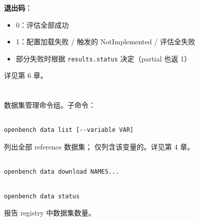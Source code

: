 \textbf{退出码}：

\begin{itemize}
  \item 0：评估全部成功
  \item 1：配置加载失败 /  触发的 NotImplemented / 评估全失败
  \item 部分失败时根据 \texttt{results.status} 决定（partial 也返 1）
\end{itemize}

详见第 6 章。

\section{}

数据集管理命令组。子命令：

\subsection{}

\begin{verbatim}
openbench data list [--variable VAR]
\end{verbatim}

列出全部 reference 数据集； 仅列含该变量的。详见第 4 章。

\subsection{}

\begin{verbatim}
openbench data download NAMES...
\end{verbatim}


\subsection{}

\begin{verbatim}
openbench data status
\end{verbatim}

报告 registry 中数据集数量。


\subsection{}

